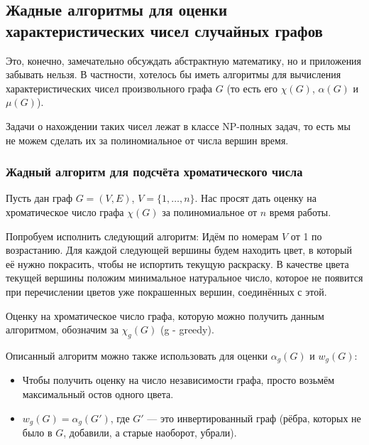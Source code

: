 \subsection{Жадные алгоритмы для оценки характеристических чисел случайных графов}

\begin{note}
	Это, конечно, замечательно обсуждать абстрактную математику, но и приложения забывать нельзя. В частности, хотелось бы иметь алгоритмы для вычисления характеристических чисел произвольного графа $G$ (то есть его $\chi(G)$, $\alpha(G)$ и $\mu(G)$).
	
	Задачи о нахождении таких чисел лежат в классе NP-полных задач, то есть мы не можем сделать их за полиномиальное от числа вершин время. 
\end{note}

\subsubsection*{Жадный алгоритм для подсчёта хроматического числа}

\begin{problem}
	Пусть дан граф $G = (V, E)$, $V = \{1, \ldots, n\}$. Нас просят дать оценку на хроматическое число графа $\chi(G)$ за полиномиальное от $n$ время работы.
\end{problem}

\begin{solution}
	Попробуем исполнить следующий алгоритм:
	Идём по номерам $V$ от 1 по возрастанию. Для каждой следующей вершины будем находить цвет, в который её нужно покрасить, чтобы не испортить текущую раскраску. В качестве цвета текущей вершины положим минимальное натуральное число, которое не появится при перечислении цветов уже покрашенных вершин, соединённых с этой.
\end{solution}

\begin{note}
	Оценку на хроматическое число графа, которую можно получить данным алгоритмом, обозначим за $\chi_g(G)$ (g - greedy).
\end{note}

\begin{corollary}
	Описанный алгоритм можно также использовать для оценки $\alpha_g(G)$ и $w_g(G)$:
	\begin{itemize}
		\item Чтобы получить оценку на число независимости графа, просто возьмём максимальный остов одного цвета.
		
		\item $w_g(G) = \alpha_g(G')$, где $G'$ --- это инвертированный граф (рёбра, которых не было в $G$, добавили, а старые наоборот, убрали).
	\end{itemize}
\end{corollary}

